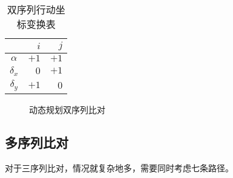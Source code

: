     \begin{minipage}{0.48\textwidth}
        \begin{table}[H]
            \centering
            \caption{双序列行动坐标变换表}\label{tab:pairwise}
            \begin{tabular}{crr}
                \toprule
                    & $i$ & $j$ \\
                \midrule
                $\alpha$ & $+1$ & $+1$ \\
                $\delta_x$ & $0$ & $+1$ \\
                $\delta_y$ & $+1$ & $0$ \\
                \bottomrule
            \end{tabular}
        \end{table}
    \end{minipage}\hfil
    \begin{minipage}{0.48\textwidth}
        \begin{figure}[H]
            \centering
            
            \caption{动态规划双序列比对}\label{fig:pairwisedp}
        \end{figure}
    \end{minipage}
    \medskip
    
    \subsection{多序列比对}\label{sec:mdp}

    对于三序列比对，情况就复杂地多，需要同时考虑七条路径。

